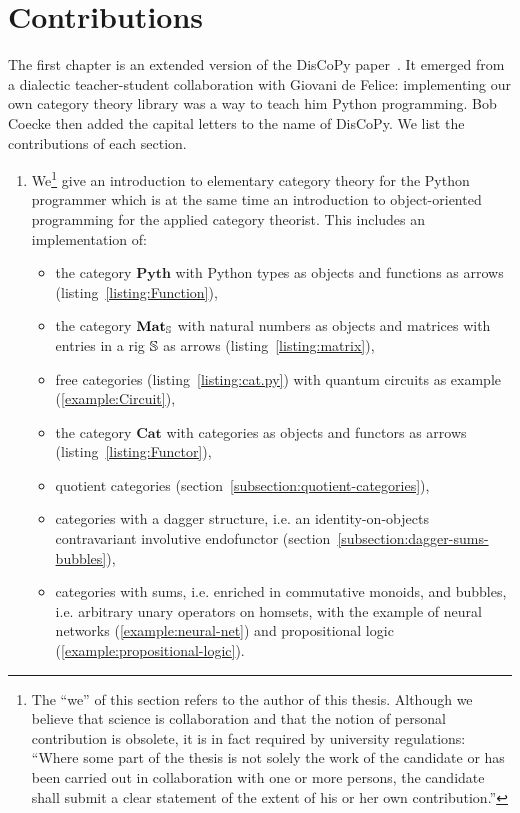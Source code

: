
\section*{Contributions}

The first chapter is an extended version of the DisCoPy paper~\cite{FeliceEtAl20a}.
It emerged from a dialectic teacher-student collaboration with Giovani de Felice: implementing our own category theory library was a way to teach him Python programming.
Bob Coecke then added the capital letters to the name of DisCoPy.
We list the contributions of each section.

\begin{enumerate}
\item We\footnote
{The ``we'' of this section refers to the author of this thesis.
Although we believe that science is collaboration and that the notion of personal contribution is obsolete, it is in fact required by university regulations: ``Where some part of the thesis is not solely the work of the candidate or has been carried out in collaboration with one or more persons, the candidate shall submit a clear statement of the extent of his or her own contribution.''}
give an introduction to elementary category theory for the Python programmer which is at the same time an introduction to object-oriented programming for the applied category theorist.
This includes an implementation of:
\begin{itemize}
    \item the category $\mathbf{Pyth}$ with Python types as objects and functions as arrows (listing~\ref{listing:Function}),
    \item the category $\mathbf{Mat}_\S$ with natural numbers as objects and matrices with entries in a rig $\S$ as arrows (listing~\ref{listing:matrix}),
    \item free categories (listing~\ref{listing:cat.py}) with quantum circuits as example (\ref{example:Circuit}),
    \item the category $\mathbf{Cat}$ with categories as objects and functors as arrows (listing~\ref{listing:Functor}),
    \item quotient categories (section~\ref{subsection:quotient-categories}),
    \item categories with a dagger structure, i.e. an identity-on-objects contravariant involutive endofunctor (section~\ref{subsection:dagger-sums-bubbles}),
    \item categories with sums, i.e. enriched in commutative monoids, and bubbles, i.e. arbitrary unary operators on homsets, with the example of neural networks (\ref{example:neural-net}) and propositional logic (\ref{example:propositional-logic}).
\end{itemize}


\end{enumerate}
